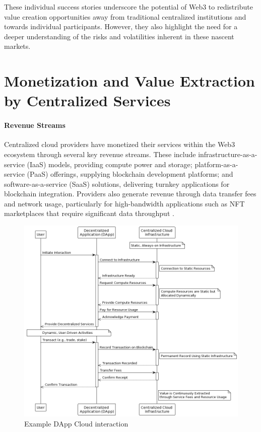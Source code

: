 \documentclass{article}
\begin{document}
These individual success stories underscore the potential of Web3 to redistribute value creation opportunities away from traditional centralized institutions and towards individual participants. However, they also highlight the need for a deeper understanding of the risks and volatilities inherent in these nascent markets.

\section{Monetization and Value Extraction by Centralized Services}

\paragraph{Revenue Streams} Centralized cloud providers have monetized their services within the Web3 ecosystem through several key revenue streams. These include infrastructure-as-a-service (IaaS) models, providing compute power and storage; platform-as-a-service (PaaS) offerings, supplying blockchain development platforms; and software-as-a-service (SaaS) solutions, delivering turnkey applications for blockchain integration. Providers also generate revenue through data transfer fees and network usage, particularly for high-bandwidth applications such as NFT marketplaces that require significant data throughput \cite{zheng2018blockchain}.


\begin{figure}[h]
  \centering
  \includegraphics[scale=0.4]{diagram12}
  \caption{Example DApp Cloud interaction}
\end{figure}
\end{document}
